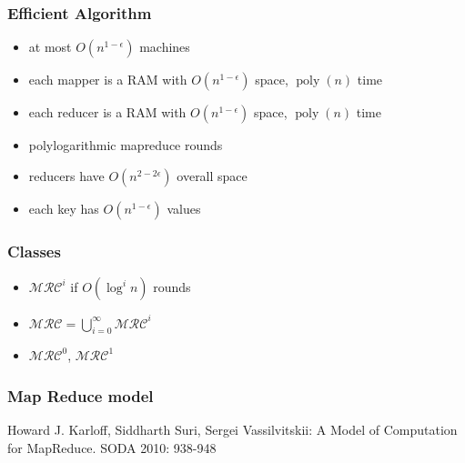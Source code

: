 \documentclass[12pt,aspectratio=169]{beamer}
\DeclareMathOperator{\poly}{\text{poly}}
\DeclareMathOperator{\polylog}{\text{polylog}}
\begin{document}
\begin{frame}\frametitle{Efficient Algorithm}
\begin{itemize}
\item
  at most  $O(n^{1-\epsilon})$ machines
\item
  each mapper is a RAM with $O(n^{1-\epsilon})$ space, $\poly(n)$ time
\item
  each reducer is a RAM with $O(n^{1-\epsilon})$ space, $\poly(n)$ time
\item
  polylogarithmic mapreduce rounds
\item
  reducers have $O(n^{2-2\epsilon})$ overall space
\item
  each key has $O(n^{1-\epsilon})$ values
\end{itemize}
\end{frame}

\begin{frame}\frametitle{Classes}
\begin{itemize}
\item
$\mathcal{MRC}^{i}$ if $O(\log^{i}n)$ rounds
\item
$\mathcal{MRC} = \bigcup_{i=0}^{\infty}\mathcal{MRC}^{i}$
\item
$\mathcal{MRC}^{0}$, $\mathcal{MRC}^{1}$
\end{itemize}
\end{frame}

\begin{frame}\frametitle{Map Reduce model}
Howard J. Karloff, Siddharth Suri, Sergei Vassilvitskii: A Model of Computation for MapReduce. SODA 2010: 938-948
\end{frame}




\end{document}
